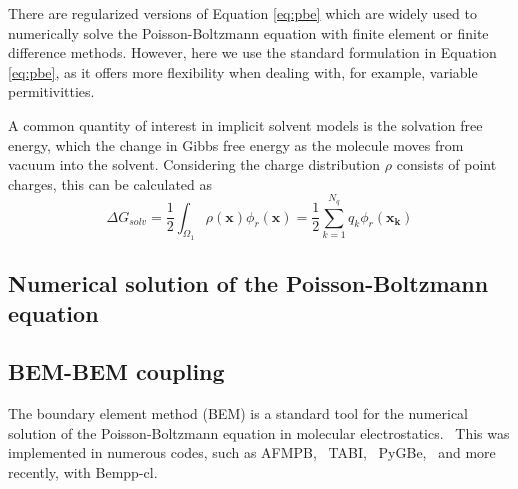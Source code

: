 There are regularized versions of Equation \eqref{eq:pbe} \cite{LuZhouHolstMcCammon2008,LeeGengZhao2021} which are widely used to numerically solve the Poisson-Boltzmann equation with finite element or finite difference methods.
However, here we use the standard formulation in Equation \eqref{eq:pbe}, as it offers more flexibility when dealing with, for example, variable permitivitties.

A common quantity of interest in implicit solvent models is the solvation free energy, which the change in Gibbs free energy as the molecule moves from vacuum into the solvent. Considering the charge distribution $\rho$ consists of point charges, this can be calculated as
%
\begin{equation}\label{eq:dG} 
\Delta G_{solv} = \frac{1}{2}\int_{\Omega_1} \rho(\mathbf{x})\phi_{r}(\mathbf{x}) = \frac{1}{2}\sum_{k=1}^{N_q} q_k\phi_r(\mathbf{x_k})
\end{equation}

\subsection*{\sffamily \large Numerical solution of the Poisson-Boltzmann equation}

\subsection*{\sffamily \large BEM-BEM coupling}

The boundary element method (BEM) is a standard tool for the numerical solution of the Poisson-Boltzmann equation in molecular electrostatics.~\cite{ZauharMorgan1985, Shaw1985} This was implemented in numerous codes, such as AFMPB,~\cite{LuETal2006} TABI,~\cite{GengKrasny2013} PyGBe,~\cite{CooperBardhanBarba2014,cooper2016pygbe} and more recently, with Bempp-cl.~\cite{search2022towards} 

